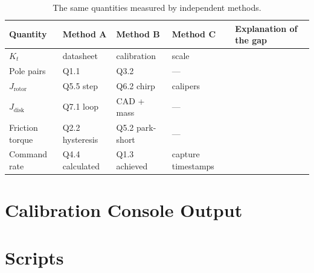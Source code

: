 \documentclass[11pt]{article}
\begin{document}
\begin{table}[H]
\centering
\caption{The same quantities measured by independent methods.}
\small
\begin{tabular}{lllll}
\toprule
Quantity & Method A & Method B & Method C & Explanation of the gap \\
\midrule
$K_t$            & datasheet & calibration & scale & \\
Pole pairs       & Q1.1 & Q3.2 & --- & \\
$J_{\text{rotor}}$ & Q5.5 step & Q6.2 chirp & calipers & \\
$J_{\text{disk}}$  & Q7.1 loop & CAD + mass & --- & \\
Friction torque  & Q2.2 hysteresis & Q5.2 park-short & --- & \\
Command rate     & Q4.4 calculated & Q1.3 achieved & capture timestamps & \\
\bottomrule
\end{tabular}
\end{table}


\appendix
\section{Calibration Console Output}
% 

\section{Scripts}
\end{document}
